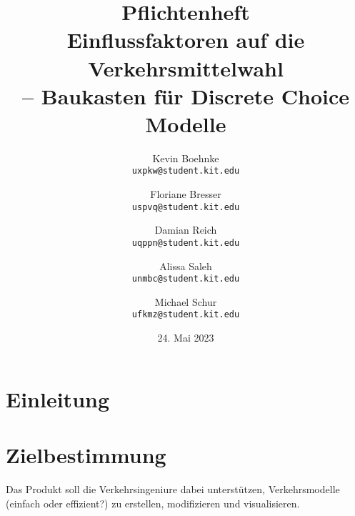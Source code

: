 \documentclass{article}
\title{Pflichtenheft \\ \large Einflussfaktoren auf die Verkehrsmittelwahl\\ -- Baukasten für Discrete Choice Modelle}
\author{Kevin Boehnke \\ \texttt{uxpkw@student.kit.edu}
\and Floriane Bresser \\ \texttt{uspvq@student.kit.edu}
\and Damian Reich \\ \texttt{uqppn@student.kit.edu}
\and Alissa Saleh \\ \texttt{unmbc@student.kit.edu}
\and Michael Schur \\ \texttt{ufkmz@student.kit.edu}}
\date{24. Mai 2023}
\begin{document}
\clearpage\maketitle\thispagestyle{empty}
\newpage
\clearpage\tableofcontents\thispagestyle{empty}
\newpage
{}

\section{Einleitung}

\section{Zielbestimmung}
Das Produkt soll die Verkehrsingeniure dabei unterstützen, Verkehrsmodelle (einfach oder effizient?) zu erstellen, modifizieren und visualisieren.
\end{document}
